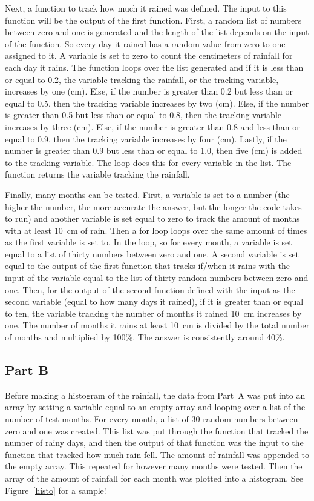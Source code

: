 \documentclass[12pt]{article}
\begin{document}
	
	Next, a function to track how much it rained was defined. The input to this function will 
	be the output of the first function. First, a random list of numbers between zero and
	one is generated and the length of the list depends on the input of the function. So 
	every day it rained has a random value from zero to one assigned to it. A 
	variable is set to zero to count the centimeters of rainfall for each day it rains. The 
	function loops over the list generated and if it is less than or equal to 0.2, the variable 
	tracking the rainfall, or the tracking variable, increases by one (cm). Else, if the number 
	is greater than 0.2 but less than or equal to 0.5, then the tracking variable increases by 
	two (cm). Else, if the number is greater than 0.5 but less than or equal to 0.8, then the 
	tracking variable increases by three (cm). Else, if the number is greater than 0.8 and 
	less than or equal to 0.9, then the tracking variable increases by four (cm). Lastly, if the 
	number is greater than 0.9 but less than or equal to 1.0, then five (cm) is added to the 
	tracking variable. The loop does this for every variable in the list. The function returns 
	the variable tracking the rainfall.
	
	Finally, many months can be tested. First, a variable is set to a number (the higher the 
	number, the more accurate the answer, but the longer the code takes to run) and 
	another variable is set equal to zero to track the amount of months with at least 10~cm 
	of rain. Then a for loop loops over the same amount of times as the first variable is set
	to. In the loop, so for every month, a variable is set equal to a list of thirty numbers 
	between zero and one. A second variable is set equal to the output of the first function
	that tracks if/when it rains with the input of the variable equal to the list of thirty random 
	numbers between zero and one. Then, for the output of the second function defined 
	with the input as the second variable (equal to how many days it rained), if it is greater 
	than or equal to ten, the variable tracking the number of months it rained 10~cm 
	increases by one. The number of months it rains at least 10~cm is divided by the total 
	number of months and multiplied by 100\%.  The answer is consistently around 40\%.
	

\subsection{Part B}

	Before making a histogram of the rainfall, the data from Part~A was put into an array by
	setting a variable equal to an empty array and looping over a list of the number of 
	test months. For every month, a list of 30 random numbers between zero and one was 
	created. This list was put through the function that tracked the number of rainy days,
	and then the output of that function was the input to the function that tracked how much 
	rain fell. The amount of rainfall was appended to the empty array. This repeated for 
	however many months were tested. Then the array of the amount of rainfall for each 
	month was plotted into a histogram. See Figure~\ref{histo} for a sample!
	
\end{document}
